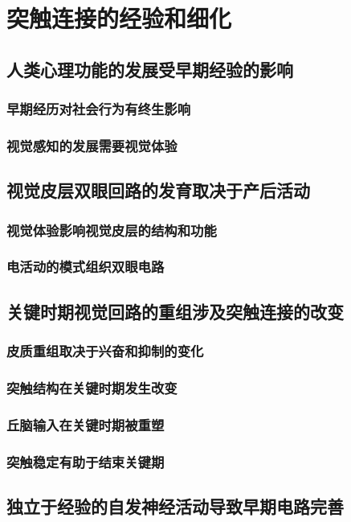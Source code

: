\chapter{突触连接的经验和细化}

\section{人类心理功能的发展受早期经验的影响}
\subsection{早期经历对社会行为有终生影响}
\subsection{视觉感知的发展需要视觉体验}

\section{视觉皮层双眼回路的发育取决于产后活动}
\subsection{视觉体验影响视觉皮层的结构和功能}
\subsection{电活动的模式组织双眼电路}

\section{关键时期视觉回路的重组涉及突触连接的改变}
\subsection{皮质重组取决于兴奋和抑制的变化}
\subsection{突触结构在关键时期发生改变}
\subsection{丘脑输入在关键时期被重塑}
\subsection{突触稳定有助于结束关键期}

\section{独立于经验的自发神经活动导致早期电路完善}

